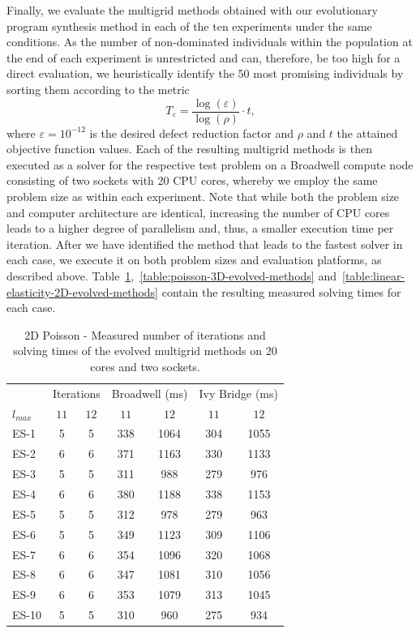 Finally, we evaluate the multigrid methods obtained with our evolutionary program synthesis method in each of the ten experiments under the same conditions.
As the number of non-dominated individuals within the population at the end of each experiment is unrestricted and can, therefore, be too high for a direct evaluation, we heuristically identify the 50 most promising individuals by sorting them according to the metric
\begin{equation}
	T_{\varepsilon} = \frac{\log(\varepsilon)}{\log(\rho)} \cdot t,
\end{equation}
where $\varepsilon = 10^{-12}$ is the desired defect reduction factor and $\rho$ and $t$ the attained objective function values.
Each of the resulting multigrid methods is then executed as a solver for the respective test problem on a Broadwell compute node consisting of two sockets with 20 CPU cores, whereby we employ the same problem size as within each experiment.
Note that while both the problem size and computer architecture are identical, increasing the number of CPU cores leads to a higher degree of parallelism and, thus, a smaller execution time per iteration.
After we have identified the method that leads to the fastest solver in each case, we execute it on both problem sizes and evaluation platforms, as described above.
Table~\ref{table:poisson-2D-evolved-methods},~\ref{table:poisson-3D-evolved-methods} and~\ref{table:linear-elasticity-2D-evolved-methods} contain the resulting measured solving times for each case.
\begin{table}
	\caption{2D Poisson - Measured number of iterations and solving times of the evolved multigrid methods on 20 cores and two sockets.}
	\label{table:poisson-2D-evolved-methods}
	\centering
	\begin{tabular}{l c c c c c c}
		\toprule
		& \multicolumn{2}{c}{Iterations} & \multicolumn{2}{c}{Broadwell (ms)} & \multicolumn{2}{c}{Ivy Bridge (ms)} \\
		\cmidrule(r){2-3} \cmidrule(r){4-5} \cmidrule(r){6-7}
		$l_{max}$ & $11$& $12$ & $11$ & $12$ & $11$ & $12$\\
		\midrule
		ES-1 & 5 & 5 & 338 & 1064 & 304 & 1055\\
		\midrule
		ES-2 & 6 & 6 & 371 & 1163 & 330 & 1133 \\
		\midrule
		ES-3 & 5 & 5 & 311 & 988 & 279 & 976 \\
		\midrule
		ES-4 & 6 & 6 & 380 & 1188 & 338 & 1153 \\
		\midrule
		ES-5 & 5 & 5 & 312 & 978 & 279 & 963 \\
		\midrule
		ES-6 & 5 & 5 & 349 & 1123 & 309 & 1106 \\
		\midrule
		ES-7 & 6 & 6 & 354 & 1096 & 320 & 1068 \\
		\midrule
		ES-8 & 6 & 6 & 347 & 1081 & 310 & 1056 \\
		\midrule
		ES-9 & 6 & 6 & 353 & 1079 & 313 & 1045 \\
		\midrule
		ES-10 & 5 & 5 & 310 & 960 & 275 & 934 \\
		\bottomrule
	\end{tabular}
\end{table}
